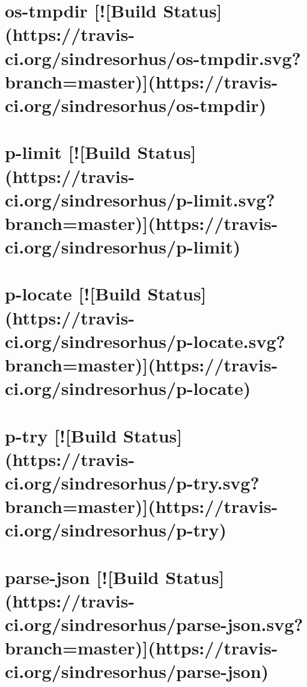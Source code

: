 \documentclass[twoside]{book}
\newcommand{\+}{\discretionary{\mbox{\scriptsize$\hookleftarrow$}}{}{}}
\begin{document}
\chapter{os-\/tmpdir \mbox{[}!\mbox{[}Build Status\mbox{]}(https\+://travis-\/ci.org/sindresorhus/os-\/tmpdir.svg?branch=master)\mbox{]}(https\+://travis-\/ci.org/sindresorhus/os-\/tmpdir)}
\label{md_dsmacc_vis_degree_node_modules_os-tmpdir_readme}

\chapter{p-\/limit \mbox{[}!\mbox{[}Build Status\mbox{]}(https\+://travis-\/ci.org/sindresorhus/p-\/limit.svg?branch=master)\mbox{]}(https\+://travis-\/ci.org/sindresorhus/p-\/limit)}
\label{md_dsmacc_vis_degree_node_modules_p-limit_readme}

\chapter{p-\/locate \mbox{[}!\mbox{[}Build Status\mbox{]}(https\+://travis-\/ci.org/sindresorhus/p-\/locate.svg?branch=master)\mbox{]}(https\+://travis-\/ci.org/sindresorhus/p-\/locate)}
\label{md_dsmacc_vis_degree_node_modules_p-locate_readme}

\chapter{p-\/try \mbox{[}!\mbox{[}Build Status\mbox{]}(https\+://travis-\/ci.org/sindresorhus/p-\/try.svg?branch=master)\mbox{]}(https\+://travis-\/ci.org/sindresorhus/p-\/try)}
\label{md_dsmacc_vis_degree_node_modules_p-try_readme}

\chapter{parse-\/json \mbox{[}!\mbox{[}Build Status\mbox{]}(https\+://travis-\/ci.org/sindresorhus/parse-\/json.svg?branch=master)\mbox{]}(https\+://travis-\/ci.org/sindresorhus/parse-\/json)}
\label{md_dsmacc_vis_degree_node_modules_parse-json_readme}

\end{document}
